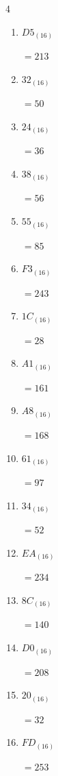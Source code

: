 \begin{multicols}{4}
\begin{enumerate}
  \item $D5_{(16)}$

        $=213$

  \item $32_{(16)}$

        $=50$

  \item $24_{(16)}$

        $=36$

  \item $38_{(16)}$

        $=56$

  \item $55_{(16)}$

        $=85$

  \item $F3_{(16)}$

        $=243$

  \item $1C_{(16)}$

        $=28$

  \item $A1_{(16)}$

        $=161$

\columnbreak %

\resetques

  \item $A8_{(16)}$

        $=168$

  \item $61_{(16)}$

        $=97$

  \item $34_{(16)}$

        $=52$

  \item $EA_{(16)}$

        $=234$

  \item $8C_{(16)}$

        $=140$

  \item $D0_{(16)}$

        $=208$

  \item $20_{(16)}$

        $=32$

  \item $FD_{(16)}$

        $=253$


\end{enumerate}
\end{multicols}
